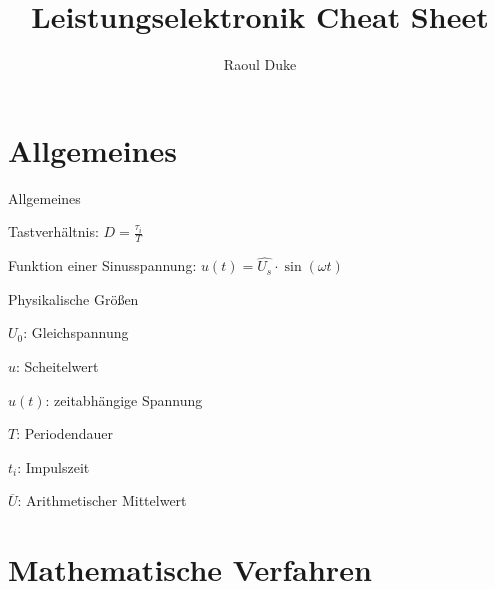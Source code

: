 \documentclass[german]{latex4ei/latex4ei_sheet}
\title{Leistungselektronik Cheat Sheet}
\author{Raoul Duke}
\begin{document}
\maketitle   %

\section{Allgemeines}
	\begin{sectionbox}
		\begin{symbolbox}{Allgemeines}
			\item Tastverhältnis: $D = \frac{\tau_i}{T}$
			\item Funktion einer Sinusspannung: $u(t) = \hat{U_s} \cdot \sin(\omega t)$
		\end{symbolbox}
		\begin{bluebox}{Physikalische Größen}
			\item $U_0$: Gleichspannung
			\item $\hat{u}$: Scheitelwert
			\item $u(t)$: zeitabhängige Spannung
			\item $T$: Periodendauer
			\item $t_i$: Impulszeit
			\item $\overline{U}$: Arithmetischer Mittelwert
		\end{bluebox}
	\end{sectionbox}
\section{Mathematische Verfahren}
\end{document}
